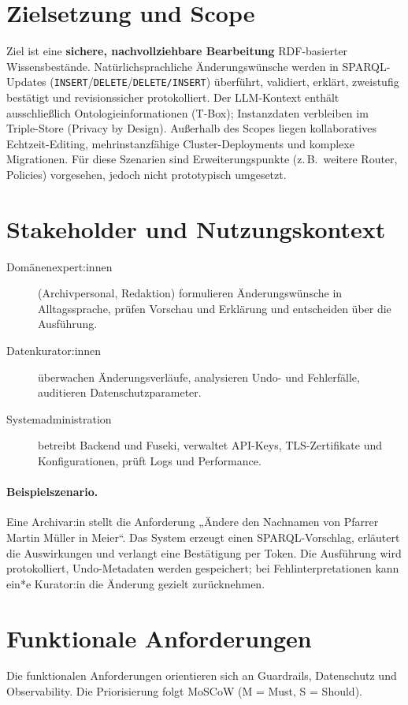 \section{Zielsetzung und Scope}
Ziel ist eine \textbf{sichere, nachvollziehbare Bearbeitung} RDF-basierter Wissensbestände. Natürlichsprachliche Änderungswünsche werden in SPARQL-Updates (\texttt{INSERT}/\texttt{DELETE}/\texttt{DELETE/INSERT}) überführt, validiert, erklärt, zweistufig bestätigt und revisionssicher protokolliert. Der LLM-Kontext enthält ausschließlich Ontologieinformationen (T-Box); Instanzdaten verbleiben im Triple-Store (Privacy by Design). Außerhalb des Scopes liegen kollaboratives Echtzeit-Editing, mehrinstanzfähige Cluster-Deployments und komplexe Migrationen. Für diese Szenarien sind Erweiterungspunkte (z.\,B.\ weitere Router, Policies) vorgesehen, jedoch nicht prototypisch umgesetzt.

\section{Stakeholder und Nutzungskontext}
\begin{description}
  \item[Domänenexpert:innen] (Archivpersonal, Redaktion) formulieren Änderungswünsche in Alltagssprache, prüfen Vorschau und Erklärung und entscheiden über die Ausführung.
  \item[Datenkurator:innen] überwachen Änderungsverläufe, analysieren Undo- und Fehlerfälle, auditieren Datenschutzparameter.
  \item[Systemadministration] betreibt Backend und Fuseki, verwaltet API-Keys, TLS-Zertifikate und Konfigurationen, prüft Logs und Performance.
\end{description}

\paragraph{Beispielszenario.}
Eine Archivar:in stellt die Anforderung „Ändere den Nachnamen von Pfarrer Martin Müller in Meier“. Das System erzeugt einen SPARQL-Vorschlag, erläutert die Auswirkungen und verlangt eine Bestätigung per Token. Die Ausführung wird protokolliert, Undo-Metadaten werden gespeichert; bei Fehlinterpretationen kann ein*e Kurator:in die Änderung gezielt zurücknehmen.

\section{Funktionale Anforderungen}
Die funktionalen Anforderungen orientieren sich an Guardrails, Datenschutz und Observability. Die Priorisierung folgt MoSCoW (M = Must, S = Should).


